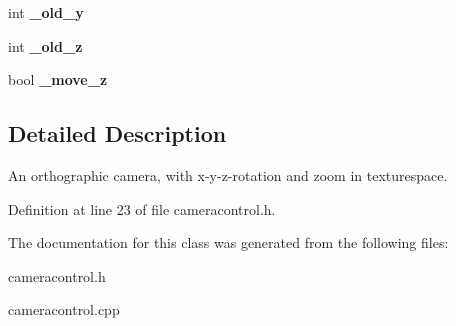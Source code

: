 \begin{DoxyCompactItemize}
\item 
int {\bfseries \-\_\-old\-\_\-y}\label{classsfs__visualizer_1_1CameraControl_a43b01f73869123d8fd76eab0d5483bed}

\item 
int {\bfseries \-\_\-old\-\_\-z}\label{classsfs__visualizer_1_1CameraControl_ad29ecf67553a892ad19fbb2c50ea3848}

\item 
bool {\bfseries \-\_\-move\-\_\-z}\label{classsfs__visualizer_1_1CameraControl_af1b2a789e93bfa77ecc97f0214c8d7c5}

\end{DoxyCompactItemize}


\subsection{Detailed Description}
An orthographic camera, with x-\/y-\/z-\/rotation and zoom in texturespace. 

Definition at line 23 of file cameracontrol.\-h.



The documentation for this class was generated from the following files\-:\begin{DoxyCompactItemize}
\item 
cameracontrol.\-h\item 
cameracontrol.\-cpp\end{DoxyCompactItemize}
